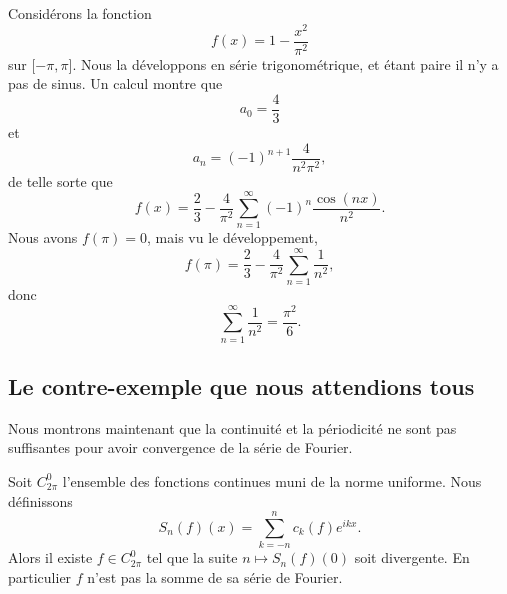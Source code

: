 \begin{example}
    Considérons la fonction
    \begin{equation}
        f(x)=1-\frac{ x^2 }{ \pi^2 }
    \end{equation}
    sur \( \mathopen[ -\pi , \pi \mathclose]\). Nous la développons en série trigonométrique, et étant paire il n'y a pas de sinus. Un calcul montre que
    \begin{equation}
        a_0=\frac{ 4 }{ 3 }
    \end{equation}
    et
    \begin{equation}
        a_n=(-1)^{n+1}\frac{ 4 }{ n^2\pi^2 },
    \end{equation}
    de telle sorte que
    \begin{equation}
        f(x)=\frac{ 2 }{ 3 }-\frac{ 4 }{ \pi^2 }\sum_{n=1}^{\infty}(-1)^n\frac{ \cos(nx) }{ n^2 }.
    \end{equation}
    Nous avons \( f(\pi)=0\), mais vu le développement,
    \begin{equation}
        f(\pi)=\frac{ 2 }{ 3 }-\frac{ 4 }{ \pi^2 }\sum_{n=1}^{\infty}\frac{1}{ n^2 },
    \end{equation}
    donc
    \begin{equation}
        \sum_{n=1}^{\infty}\frac{1}{ n^2 }=\frac{ \pi^2 }{ 6 }.
    \end{equation}
\end{example}

\subsection{Le contre-exemple que nous attendions tous}

Nous montrons maintenant que la continuité et la périodicité ne sont pas suffisantes pour avoir convergence de la série de Fourier.

\begin{proposition} \label{PropREkHdol}
    Soit \( C^0_{2\pi}\) l'ensemble des fonctions continues muni de la norme uniforme. Nous définissons
    \begin{equation}
        S_n(f)(x)=\sum_{k=-n}^nc_k(f) e^{ikx}.
    \end{equation}
    Alors il existe \( f\in C^0_{2\pi}\) tel que la suite \(n\mapsto S_n(f)(0)\) soit divergente. En particulier \( f\) n'est pas la somme de sa série de Fourier.
\end{proposition}


